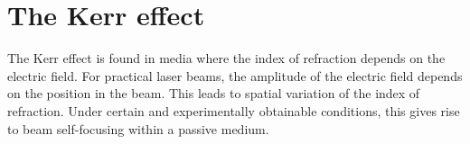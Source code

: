 \chapter{The Kerr effect}
\label{cha:kerr}

The Kerr effect is found in media where the index of refraction 
depends on the electric field. For practical
laser beams, the %
amplitude of the electric
field depends on the position in the beam.
This leads to spatial variation of the index of refraction. Under
certain and experimentally obtainable conditions, this gives rise to
beam self-focusing within a passive medium.






